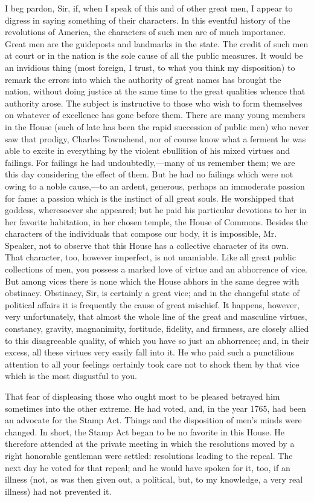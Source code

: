 I beg pardon, Sir, if, when I speak of this and of other great men, I appear to digress in saying something of their characters. In this eventful history of the revolutions of America, the characters of such men are of much importance. Great men are the guideposts and landmarks in the state. The credit of such men at court or in the nation is the sole cause of all the public measures. It would be an invidious thing (most foreign, I trust, to what you think my disposition) to remark the errors into which the authority of great names has brought the nation, without doing justice at the same time to the great qualities whence that authority arose. The subject is instructive to those who wish to form themselves on whatever of excellence has gone before them. There are many young members in the House (such of late has been the rapid succession of public men) who never saw that prodigy, Charles Townshend, nor of course know what a ferment he was able to excite in everything by the violent ebullition of his mixed virtues and failings. For failings he had undoubtedly,—many of us remember them; we are this day considering the effect of them. But he had no failings which were not owing to a noble cause,—to an ardent, generous, perhaps an immoderate passion for fame: a passion which is the instinct of all great souls. He worshipped that goddess, wheresoever she appeared; but he paid his particular devotions to her in her favorite habitation, in her chosen temple, the House of Commons. Besides the characters of the individuals that compose our body, it is impossible, Mr. Speaker, not to observe that this House has a collective character of its own. That character, too, however imperfect, is not unamiable. Like all great public collections of men, you possess a marked love of virtue and an abhorrence of vice. But among vices there is none which the House abhors in the same degree with obstinacy. Obstinacy, Sir, is certainly a great vice; and in the changeful state of political affairs it is frequently the cause of great mischief. It happens, however, very unfortunately, that almost the whole line of the great and masculine virtues, constancy, gravity, magnanimity, fortitude, fidelity, and firmness, are closely allied to this disagreeable quality, of which you have so just an abhorrence; and, in their excess, all these virtues very easily fall into it. He who paid such a punctilious attention to all your feelings certainly took care not to shock them by that vice which is the most disgustful to you.

That fear of displeasing those who ought most to be pleased betrayed him sometimes into the other extreme. He had voted, and, in the year 1765, had been an advocate for the Stamp Act. Things and the disposition of men's minds were changed. In short, the Stamp Act began to be no favorite in this House. He therefore attended at the private meeting in which the resolutions moved by a right honorable gentleman were settled: resolutions leading to the repeal. The next day he voted for that repeal; and he would have spoken for it, too, if an illness (not, as was then given out, a political, but, to my knowledge, a very real illness) had not prevented it.

